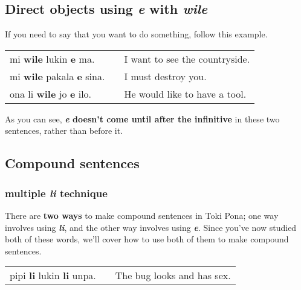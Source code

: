 {}
\subsection*{Direct objects using \textit{e} with \textit{wile}}
%
If you need to say that you want to do something, follow this example.

\begin{supertabular}{p{5,5cm}|ll}
mi \textbf{wile} lukin \textbf{e} ma. && I want to see the countryside. \\
mi \textbf{wile} pakala \textbf{e} sina. && I must destroy you. \\
ona li \textbf{wile} jo \textbf{e} ilo. && He would like to have a tool. \\
\end{supertabular} 

As you can see, \textbf{\textit{e} doesn't come until after the infinitive} in these two sentences, rather than before it. 

\newpage
{}
\label{'multiple_li'}
\subsection*{Compound sentences}
\subsubsection*{multiple \textit{li} technique}
%
There are \textbf{two ways} to make compound sentences in Toki Pona; one way involves using \textbf{\textit{li}}, and the other way involves using \textbf{\textit{e}}. 
Since you've now studied both of these words, we'll cover how to use both of them to make compound sentences. 

\begin{supertabular}{p{5,5cm}|ll}
pipi \textbf{li} lukin \textbf{li} unpa. && The bug looks and has sex. \\
\end{supertabular} 

